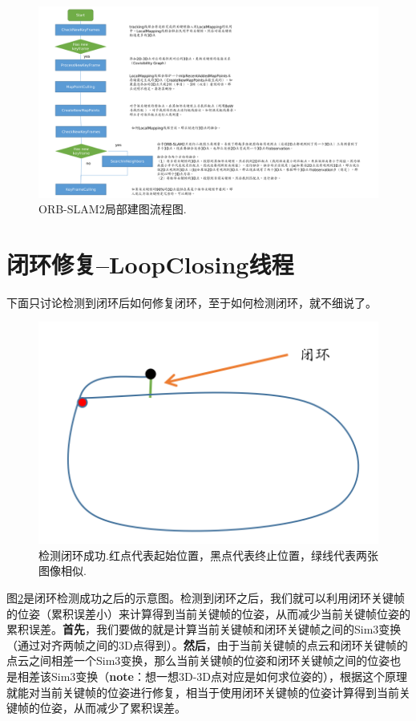 \begin{figure}[h]%
	\centering  %
	\includegraphics[width=1.0\linewidth]{image/ORB-SLAM/LocalMapping.pdf}  %
	\caption{ORB-SLAM2局部建图流程图.}  %
	\label{fig:local_mapping}   %
\end{figure}





\section{闭环修复--LoopClosing线程}



下面只讨论检测到闭环后如何修复闭环，至于如何检测闭环，就不细说了。

\begin{figure}[h]%
	\centering  %
	\includegraphics[width=0.4\linewidth]{image/ORB-SLAM/DetectedLoop.png}  %
	\caption{检测闭环成功.红点代表起始位置，黑点代表终止位置，绿线代表两张图像相似.}  %
	\label{fig:detected_loop}   %
\end{figure}



图\ref{fig:detected_loop}是闭环检测成功之后的示意图。检测到闭环之后，我们就可以利用闭环关键帧的位姿（累积误差小）来计算得到当前关键帧的位姿，从而减少当前关键帧位姿的累积误差。\textbf{首先}，我们要做的就是计算当前关键帧和闭环关键帧之间的Sim3变换（通过对齐两帧之间的3D点得到）。\textbf{然后}，由于当前关键帧的点云和闭环关键帧的点云之间相差一个Sim3变换，那么当前关键帧的位姿和闭环关键帧之间的位姿也是相差该Sim3变换（\textbf{note}：想一想3D-3D点对应是如何求位姿的），根据这个原理就能对当前关键帧的位姿进行修复，相当于使用闭环关键帧的位姿计算得到当前关键帧的位姿，从而减少了累积误差。

